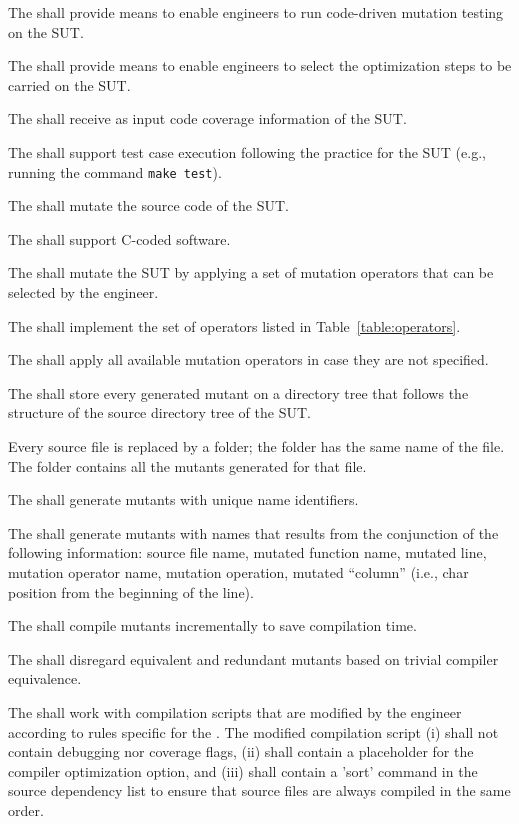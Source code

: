 \RQ{} The \FAQAS shall provide means to enable engineers to run code-driven mutation testing on the SUT.

\RQ{} The \FAQAS shall provide means to enable engineers to select the optimization steps to be carried on the SUT.

\RQ{} The \FAQAS shall receive as input code coverage information of the SUT.

\RQ{} The \FAQAS shall support test case execution following the practice for the SUT (e.g., running the command \texttt{make test}).

\RQ{} The \FAQAS shall mutate the source code of the SUT.

\RQ{} The \FAQAS shall support C-coded software.

\RQ{} The \FAQAS shall mutate the SUT by applying a set of mutation operators that can be selected by the engineer.

\RQ{} The \FAQAS shall implement the set of operators listed in Table~\ref{table:operators}.



\RQ{} The \FAQAS shall apply all available mutation operators in case they are not specified.

\RQ{} The \FAQAS shall store every generated mutant on a directory tree that follows the structure of the source directory tree of the SUT.

\remark Every source file is replaced by a folder; the folder has the same name of the file. The folder contains all the mutants generated for that file.

\RQ{} The \FAQAS shall generate mutants with unique name identifiers.

\RQ{} The \FAQAS shall generate mutants with names that results from the conjunction of the following information:
source file name, mutated function name, mutated line, mutation operator name, mutation operation, mutated ``column'' (i.e., char position from the beginning of the line).

\RQ{} The \FAQAS shall compile mutants incrementally to save compilation time.

\RQ{} The \FAQAS shall disregard equivalent and redundant mutants based on trivial compiler equivalence.

\RQ{} The \FAQAS shall work with compilation scripts that are modified by the engineer according to rules specific for the \FAQAS.
The modified compilation script (i) shall not contain debugging nor coverage flags, (ii) shall contain a placeholder for the compiler optimization option, and (iii) shall contain a 'sort' command in the source dependency list to ensure that source files are always compiled in the same order.

